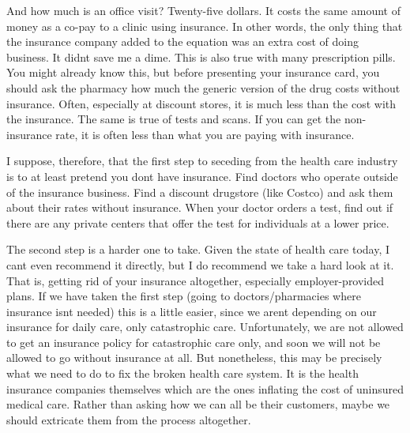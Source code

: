 \documentclass[letterpaper]{article}
\begin{document}
{\color{black}
And how much is an office visit?  Twenty-five dollars. It costs the same
amount of money as a co-pay to a clinic using insurance. In other
words, the only thing that the insurance company added to the equation
was an extra cost of doing business. It didn{\textquotesingle}t save me
a dime. This is also true with many prescription pills.
\textcolor[rgb]{0.32941177,0.5529412,0.83137256}{You might already know
this, but b}efore presenting your insurance card, you should ask the
pharmacy how much the generic version of the drug costs without
insurance. Often, especially at discount stores, it is much less than
the cost with the insurance.  The same is true of tests and scans. If
you can get the non-insurance rate, it is often less than what you are
paying with insurance.}

{\color{black}
\textcolor[rgb]{0.32941177,0.5529412,0.83137256}{I suppose, therefore,
that}\textit{\textcolor[rgb]{0.32941177,0.5529412,0.83137256}{ }}the
first step to seceding from the health care industry is to at least
pretend you don{\textquotesingle}t have insurance. Find doctors who
operate outside of the insurance business. Find a discount drugstore
(like Costco) and ask them about their rates without insurance. When
your doctor orders a test, find out if there are any private centers
that offer the test for individuals at a lower price. }

{\color{black}
The second step is a harder one to take. Given the state of health care
today, I can{\textquotesingle}t even recommend it directly, but I do
recommend we take a hard look at it. That is, getting rid of your
insurance altogether, especially employer-provided plans.
\textcolor[rgb]{0.32941177,0.5529412,0.83137256}{ }If we have taken the
first step (going to doctors/pharmacies where insurance
isn{\textquotesingle}t needed) this is a little easier, since we
aren{\textquotesingle}t depending on our insurance for daily care, only
catastrophic care.  Unfortunately, we are not allowed to get an
insurance policy for catastrophic care only, and soon we will not be
allowed to go without insurance at all.  But nonetheless, this may be
precisely what we need to do to fix the broken health care system.  It
is the health insurance companies themselves which are the ones
inflating the cost of uninsured medical care.  Rather than asking how
we can all be their customers, maybe we should extricate them from the
process altogether.}
\end{document}
